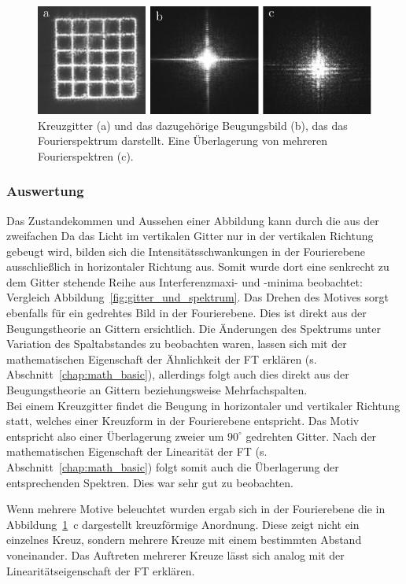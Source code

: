 \begin{figure}[ht]
	\centering
	\includegraphics{images/Regina/abb14.pdf}
	\caption[Kreuzgitter mit Fourierspektrum]{
		Kreuzgitter (a) und das dazugehörige Beugungsbild (b), das das Fourierspektrum darstellt. Eine Überlagerung von mehreren Fourierspektren (c).
	}
	\label{fig:kreuzgitter_und_spektrum}
\end{figure}



\subsubsection*{Auswertung}
Das Zustandekommen und Aussehen einer Abbildung kann durch die aus der zweifachen 
Da das Licht im vertikalen Gitter nur in der vertikalen Richtung gebeugt wird, bilden sich die Intensitätsschwankungen in der Fourierebene ausschließlich in horizontaler Richtung aus. Somit wurde dort eine senkrecht zu dem Gitter stehende Reihe aus Interferenzmaxi- und -minima beobachtet: Vergleich Abbildung~\ref{fig:gitter_und_spektrum}. Das Drehen des Motives sorgt ebenfalls für ein gedrehtes Bild in der Fourierebene. Dies ist direkt aus der Beugungstheorie an Gittern ersichtlich. Die Änderungen des Spektrums unter Variation des Spaltabstandes zu beobachten waren, lassen sich mit der mathematischen Eigenschaft der Ähnlichkeit der FT erklären (s. Abschnitt~\ref{chap:math_basic}), allerdings folgt auch dies direkt aus der Beugungstheorie an Gittern beziehungsweise Mehrfachspalten.\\

Bei einem Kreuzgitter findet die Beugung in horizontaler und vertikaler Richtung statt, welches einer Kreuzform in der Fourierebene entspricht. Das Motiv entspricht also einer Überlagerung zweier um $90^\circ$ gedrehten Gitter. Nach der mathematischen Eigenschaft der Linearität der FT (s. Abschnitt~\ref{chap:math_basic}) folgt somit auch die Überlagerung der entsprechenden Spektren. Dies war sehr gut zu beobachten.

Wenn mehrere Motive beleuchtet wurden ergab sich in der Fourierebene die in Abbildung~\ref{fig:kreuzgitter_und_spektrum}~c dargestellt kreuzförmige Anordnung. Diese zeigt nicht ein einzelnes Kreuz, sondern mehrere Kreuze mit einem bestimmten Abstand voneinander. Das Auftreten mehrerer Kreuze lässt sich analog mit der Linearitätseigenschaft der FT erklären.


